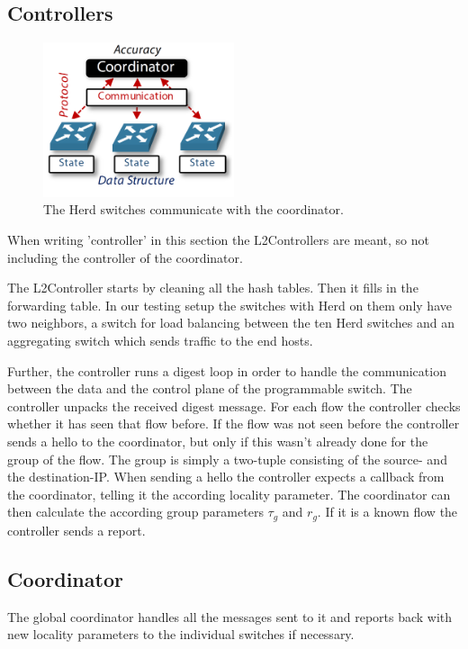 \documentclass[11pt,oneside,a4paper]{article}
\begin{document}
\subsection{Controllers} \label{controller}

\begin{figure}
	\centering
	\includegraphics[width=0.5\textwidth,scale=1]{figures/global_local_paper}
	\caption{The Herd switches communicate with the coordinator. \cite{anon2019herd}}
	\label{fig:global_fig}
\end{figure}

When writing 'controller' in this section the L2Controllers are meant, so not including the controller of the coordinator. 

The L2Controller starts by cleaning all the hash tables. Then it fills in the forwarding table. In our testing setup the switches with Herd on them only have two neighbors, a switch for load balancing between the ten Herd switches and an aggregating switch which sends traffic to the end hosts.

Further, the controller runs a digest loop in order to handle the communication between the data and the control plane of the programmable switch. The controller unpacks the received digest message. For each flow the controller checks whether it has seen that flow before. If the flow was not seen before the controller sends a hello to the coordinator, but only if this wasn't already done for the group of the flow. The group is simply a two-tuple consisting of the source- and the destination-IP. When sending a hello the controller expects a callback from the coordinator, telling it the according locality parameter. The coordinator can then calculate the according group parameters $\tau_g$ and $r_g$. If it is a known flow the controller sends a report. %

\subsection{Coordinator} \label{coordinator}
The global coordinator handles all the messages sent to it and reports back with new locality parameters to the individual switches if necessary. 
\end{document}
